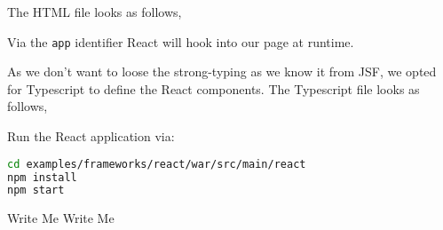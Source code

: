 The HTML file looks as follows,

Via the \texttt{app} identifier React will hook into our page at runtime.

As we don't want to loose the strong-typing as we know it from JSF, we opted for Typescript to define the React components.
The Typescript file looks as follows,


Run the React application via:
\begin{lstlisting}[language=bash]
cd examples/frameworks/react/war/src/main/react
npm install
npm start
\end{lstlisting}

\begin{TODO}{Write Me}
	Write Me
\end{TODO}